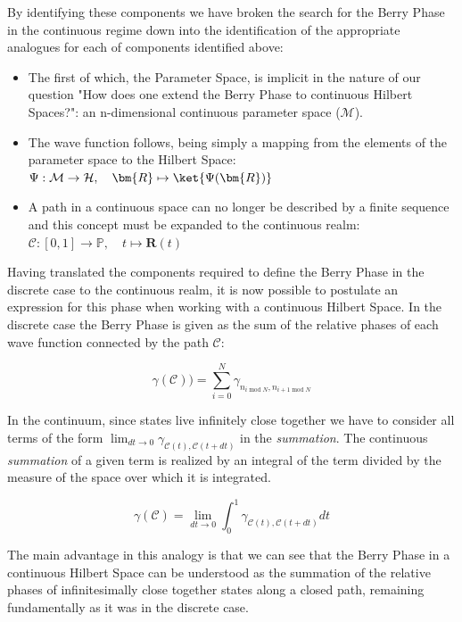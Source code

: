 \documentclass{article}
\begin{document}
By identifying these components we have broken the search for the Berry Phase in the continuous regime down into the identification of the appropriate analogues for each of components identified above:

\begin{itemize}

  \item The first of which, the Parameter Space, is implicit in the nature of our question "How does one extend the Berry Phase to continuous Hilbert Spaces?": an n-dimensional continuous parameter space ($\mathcal{M}$).
  \item The wave function follows, being simply a mapping from the elements of the parameter space to the Hilbert Space: $\Psi: \mathcal{M} \rightarrow \mathcal{H}, \quad \bm{R} \mapsto \ket{\Psi(\bm{R})}$

  \item A path in a continuous space can no longer be described by a finite sequence and this concept must be expanded to the continuous realm:
  $\mathcal{C}: [0, 1] \rightarrow \mathbb{P}, \quad t \mapsto \bm{R}(t)$
\end{itemize}

Having translated the components required to define the Berry Phase in the discrete case to the continuous realm, it is now possible to postulate an expression for this phase when working with a continuous Hilbert Space. In the discrete case the Berry Phase is given as the sum of the relative phases of each wave function connected by the path $\mathcal{C}$:

\begin{equation*}
\gamma(\mathcal{C})) = \sum_{i = 0}^{N} \gamma_{n_{i \; \mathrm{mod} \; N}, n_{i+1 \; \mathrm{mod} \; N}} 
\end{equation*}

In the continuum, since states live infinitely close together we have to consider all terms of the form $\lim_{dt \to 0}\gamma_{\mathcal{C}(t), \mathcal{C}(t + dt)}$ in the \textit{summation}. The continuous \textit{summation} of a given term is realized by an integral of the term divided by the measure of the space over which it is integrated.

\begin{equation}\label{eq:berry_phase_analog}
  \gamma(\mathcal{C}) = \lim_{dt \to 0} \int_0^1 \gamma_{\mathcal{C}(t), \mathcal{C}(t + dt)} dt
\end{equation}

The main advantage in this analogy is that we can see that the Berry Phase in a continuous Hilbert Space can be understood as the summation of the relative phases of infinitesimally close together states along a closed path, remaining fundamentally as it was in the discrete case.
\end{document}
